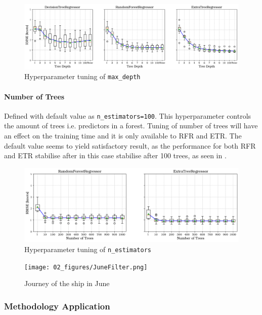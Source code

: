 \begin{figure}[h]
    \centering
        \includegraphics[width=.95\textwidth]{02_figures/hpo_max_depth.png}
        \caption{Hyperparameter tuning of {\tt max\_depth}}
        \label{fig:hpo_max_depth}
\end{figure}

\paragraph{Number of Trees}\label{n_estimators}

Defined with default value as {\tt n\_estimators=100}. This hyperparameter controls the amount of trees i.e. predictors in a forest. Tuning of number of trees will have an effect on the training time and it is only available to RFR and ETR. The default value seems to yield satisfactory result, as the performance for both RFR and ETR stabilise after in this case stabilise after 100 trees, as seen in . 

\begin{figure}[h]
    \centering
        \includegraphics[width=.95\textwidth]{02_figures/hpo_n_estimators.png}
        \caption{Hyperparameter tuning of {\tt n\_estimators}}
        \label{fig:n_estimators}
\end{figure}


\begin{figure}
    \centering
        \texttt{[image: 02\_figures/JuneFilter.png]}
        \caption{Journey of the ship in June}
        \label{fig:JuneJourney}
\end{figure}

\subsubsection{Methodology Application}\label{methodology_application}



